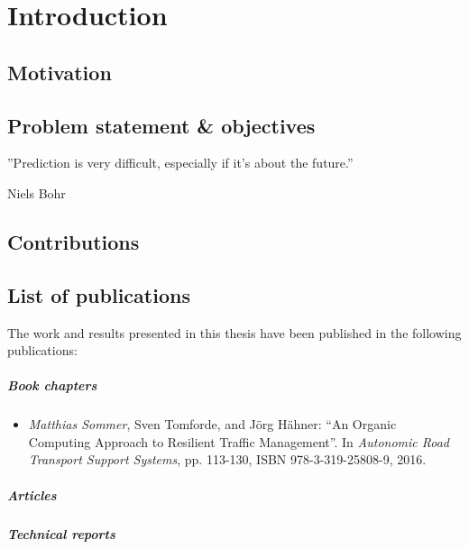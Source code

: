 \chapter{Introduction} 
\label{sec:Introduction}

\section{Motivation}







\section{Problem statement \& objectives}

\epigraph{''Prediction is very difficult, especially if it's about the future.''}{Niels Bohr}
%




\section{Contributions}




\section{List of publications}
The work and results presented in this thesis have been published in the following publications:

\paragraph{Book chapters}
\begin{itemize}	
	\item \textit{Matthias Sommer}, Sven Tomforde, and Jörg Hähner: ``An Organic Computing Approach to Resilient Traffic Management''. In \textit{Autonomic Road Transport Support Systems}, pp. 113-130, ISBN 978-3-319-25808-9, 2016.
\end{itemize}

\paragraph{Articles}



\paragraph{Technical reports}


